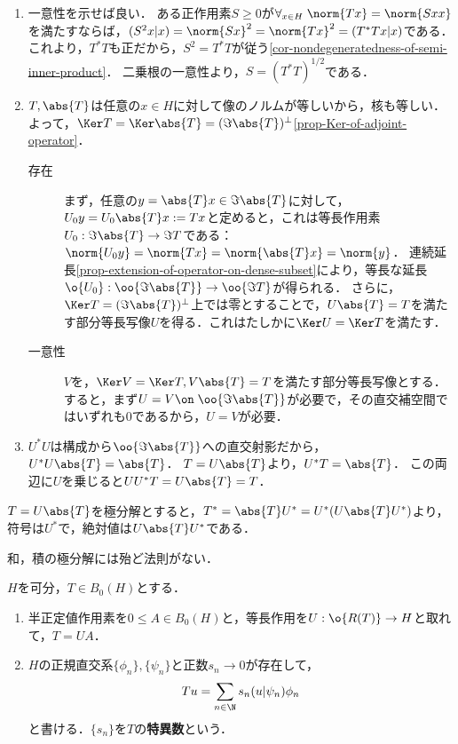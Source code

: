 \documentclass[uplatex,dvipdfmx]{jsreport}
\begin{document}
\begin{Proof}\mbox{}
    \begin{enumerate}
        \item 一意性を示せば良い．
        ある正作用素$S\ge0$が$\forall_{x\in H}\;\norm{Tx}=\norm{Sxx}$を満たすならば，$(S^2x|x)=\norm{Sx}^2=\norm{Tx}^2=(T^*Tx|x)$である．これより，$T^*T$も正だから，$S^2=T^*T$が従う\ref{cor-nondegeneratedness-of-semi-inner-product}．
        二乗根の一意性より，$S=(T^*T)^{1/2}$である．
        \item $T,\abs{T}$は任意の$x\in H$に対して像のノルムが等しいから，核も等しい．よって，$\Ker T=\Ker\abs{T}=(\Im\abs{T})^\perp$\ref{prop-Ker-of-adjoint-operator}．
        \begin{description}
            \item[存在] まず，任意の$y=\abs{T}x\in\Im\abs{T}$に対して，$U_0y=U_0\abs{T}x:=Tx$と定めると，これは等長作用素$U_0:\Im\abs{T}\to\Im T$である：$\norm{U_0y}=\norm{Tx}=\norm{\abs{T}x}=\norm{y}$．
            連続延長\ref{prop-extension-of-operator-on-dense-subset}により，等長な延長$\o{U_0}:\oo{\Im\abs{T}}\to\oo{\Im T}$が得られる．
            さらに，$\Ker T=(\Im\abs{T})^\perp$上では零とすることで，$U\abs{T}=T$を満たす部分等長写像$U$を得る．これはたしかに$\Ker U=\Ker T$を満たす．
            \item[一意性] 
            $V$を，$\Ker V=\Ker T,V\abs{T}=T$を満たす部分等長写像とする．
            すると，まず$U=V\on\;\oo{\Im\abs{T}}$が必要で，その直交補空間ではいずれも$0$であるから，$U=V$が必要．
        \end{description}
        \item $U^*U$は構成から$\oo{\Im\abs{T}}$への直交射影だから，$U^*U\abs{T}=\abs{T}$．
        $T=U\abs{T}$より，$U^*T=\abs{T}$．
        この両辺に$U$を乗じると$UU^*T=U\abs{T}=T$．
    \end{enumerate}
\end{Proof}

\begin{corollary}[随伴作用素の極分解]
    $T=U\abs{T}$を極分解とすると，$T^*=\abs{T}U^*=U^*(U\abs{T}U^*)$より，符号は$U^*$で，絶対値は$U\abs{T}U^*$である．
\end{corollary}
\begin{remark}
    和，積の極分解には殆ど法則がない．
\end{remark}

\begin{corollary}[Schmidt展開]
    $H$を可分，$T\in B_0(H)$とする．
    \begin{enumerate}
        \item 半正定値作用素を$0\le A\in B_0(H)$と，等長作用を$U:\o{R(T)}\to H$と取れて，$T=UA$．
        \item $H$の正規直交系$\{\phi_n\},\{\psi_n\}$と正数$s_n\to0$が存在して，
        \[Tu=\sum_{n\in\N}s_n(u|\psi_n)\phi_n\]
        と書ける．$\{s_n\}$を$T$の\textbf{特異数}という．
    \end{enumerate}
\end{corollary}
\end{document}
